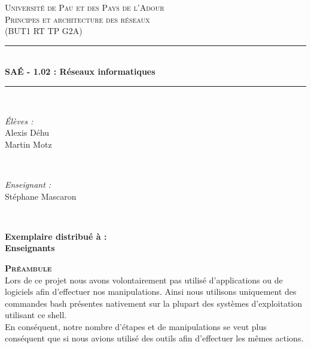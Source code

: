 \documentclass[a4paper]{article}
\newcommand{\HRule}{\rule{\linewidth}{0.5mm}}
\begin{document}
\begin{titlepage}
\center
\textsc{\LARGE Université de Pau et des Pays de l’Adour}\\[1.3cm]
\textsc{\Large Principes et architecture des réseaux }\\[0.6cm]
\textsc{\large (BUT1 RT TP G2A)}\\[0.6cm]
\HRule \\[0.4cm]
{ \huge \bfseries SAÉ - 1.02 : Réseaux informatiques}\\[0.4cm]
\HRule \\[1.5cm]
\begin{minipage}{0.4\textwidth}
\begin{flushleft} \large
\emph{Élèves :}\\[.5cm]
Alexis Déhu 
\\[.5cm]
Martin Motz\\[.5cm]
\end{flushleft}
\end{minipage}
~
\begin{minipage}{0.4\textwidth}
\begin{flushright} \large
\emph{Enseignant :} \\
Stéphane Mascaron \end{flushright}
\end{minipage}\\[3cm]
\begin{center}
\bfseries Exemplaire distribué à :\\Enseignants
\end{center} 
\vfill \mbox{}
\end{titlepage}
\vspace{1pt}
\textsc{\textbf{Préambule}} \\
Lors de ce projet nous avons volontairement pas utilisé d’applications ou de logiciels afin d'effectuer nos manipulations. Ainsi nous utilisons uniquement des commandes bash présentes nativement sur la plupart des systèmes d’exploitation utilisant ce shell.\\En conséquent, notre nombre d'étapes et de manipulations se veut plus conséquent que si nous avions utilisé des outils afin d'effectuer les mêmes actions.
\newline
\renewcommand*\contentsname{Table des matières}
\tableofcontents
\newpage
\end{document}
